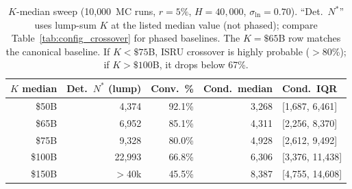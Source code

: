 \begin{table}[htbp]
\centering
\caption{$K$-median sweep (10{,}000~MC runs, $r = 5\%$, $H = 40{,}000$, $\sigma_{\ln} = 0.70$). ``Det.\ $N^*$'' uses lump-sum $K$ at the listed median value (not phased); compare Table~\ref{tab:config_crossover} for phased baselines. The $K = \$65$B row matches the canonical baseline. If $K < \$75$B, ISRU crossover is highly probable ($>$80\%); if $K > \$100$B, it drops below 67\%.}
\label{tab:k_median_sweep}
\small
\begin{tabular}{@{}rrrrl@{}}
\toprule
$K$ median & Det.\ $N^*$ (lump) & Conv.\ \% & Cond.\ median & Cond.\ IQR \\
\midrule
\$50B  & 4{,}374  & 92.1\% & 3{,}268  & [1{,}687, 6{,}461] \\
\$65B  & 6{,}952  & 85.1\% & 4{,}311  & [2{,}256, 8{,}370] \\
\$75B  & 9{,}328  & 80.0\% & 4{,}928  & [2{,}612, 9{,}492] \\
\$100B & 22{,}993 & 66.8\% & 6{,}306  & [3{,}376, 11{,}438] \\
\$150B & $>$40k   & 45.5\% & 8{,}387  & [4{,}755, 14{,}608] \\
\bottomrule
\end{tabular}
\end{table}
